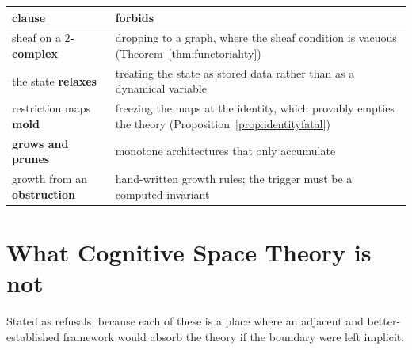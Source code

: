 \begin{center}
\begin{tabular}{@{}>{\raggedright\arraybackslash}p{}%
                  >{\raggedright\arraybackslash}p{}@{}}
\toprule
\textbf{clause} & \textbf{forbids} \\
\midrule
sheaf on a \textbf{$2$-complex} &
  dropping to a graph, where the sheaf condition is vacuous
  (Theorem~\ref{thm:functoriality})\\
\addlinespace[2pt]
the state \textbf{relaxes} &
  treating the state as stored data rather than as a dynamical variable\\
\addlinespace[2pt]
restriction maps \textbf{mold} &
  freezing the maps at the identity, which provably empties the theory
  (Proposition~\ref{prop:identityfatal})\\
\addlinespace[2pt]
\textbf{grows and prunes} &
  monotone architectures that only accumulate\\
\addlinespace[2pt]
growth from an \textbf{obstruction} &
  hand-written growth rules; the trigger must be a computed invariant\\
\bottomrule
\end{tabular}
\end{center}

\section{What Cognitive Space Theory is not}\label{sec:isnot}

Stated as refusals, because each of these is a place where an adjacent and
better-established framework would absorb the theory if the boundary were left
implicit.

